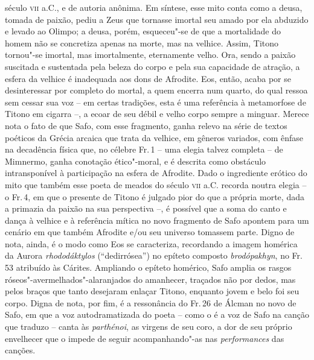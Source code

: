 século \textsc{vii} a.C., e de autoria anônima. Em síntese, esse mito conta como a
deusa, tomada de paixão, pediu a Zeus que tornasse imortal seu amado por ela abduzido e levado ao Olimpo; a deusa,
porém, esqueceu"-se de que a mortalidade do homem não se concretiza apenas na
morte, mas na velhice. Assim, Titono tornou"-se imortal, mas imortalmente,
eternamente velho. Ora, sendo a paixão suscitada e sustentada pela
beleza do corpo e pela sua capacidade de atração, a esfera da velhice é
inadequada aos dons de Afrodite. Eos, então, acaba por se desinteressar por
completo do mortal, a quem encerra num quarto, do qual ressoa sem cessar sua
voz -- em certas tradições, esta é uma referência à metamorfose de Titono em
cigarra --, a ecoar de seu débil e velho corpo sempre a minguar. Merece nota o fato de
que Safo, com esse fragmento, ganha relevo na série de textos poéticos da
Grécia arcaica que trata da velhice, em gêneros variados, com ênfase na
decadência física que, no célebre Fr.\,1 -- uma elegia talvez completa -- de
Mimnermo, ganha conotação ético"-moral, e é descrita como obstáculo
intransponível à participação na esfera de Afrodite.
Dado o ingrediente erótico do mito que também esse poeta de meados do século
\textsc{vii} a.C. recorda noutra elegia -- o Fr.\,4, em que o presente de Titono é
julgado pior do que a própria morte, dada a primazia da paixão na sua perspectiva
--, é possível que a soma do canto e dança à
velhice e à referência mítica no novo fragmento de Safo apontem para um cenário
em que também Afrodite e/ou seu universo tomassem parte. Digno de nota, ainda,
é o modo como Eos se caracteriza, recordando a imagem homérica da Aurora
\textit{rhododáktylos} (``dedirrósea'') no
epíteto composto \textit{brodópakhyn}, no Fr.\,53 atribuído às Cárites.
Ampliando o epíteto homérico, Safo amplia os rasgos
róseos"-avermelhados"-alaranjados do amanhecer, traçados não por dedos, mas pelos
braços que tanto desejaram enlaçar Titono, enquanto jovem e belo foi seu
corpo. Digna de nota, por fim, é a ressonância do Fr.\,26 de Álcman no novo de Safo, em que a voz autodramatizada do poeta -- como o é a voz de Safo na canção que traduzo -- canta às \textit{parthénoi}, as virgens de seu coro, a dor de seu próprio envelhecer que o impede de seguir acompanhando"-as nas \textit{performances} das canções.


